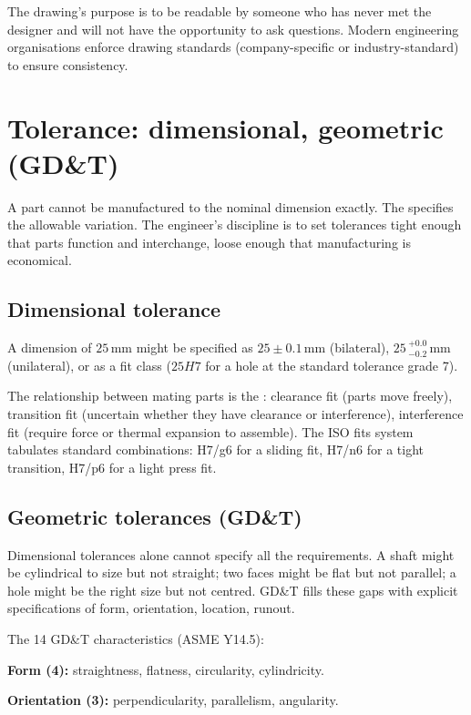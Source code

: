 The drawing's purpose is to be readable by someone who has never met the designer and will not have the opportunity to ask questions. Modern engineering organisations enforce drawing standards (company-specific or industry-standard) to ensure consistency.

\section{Tolerance: dimensional, geometric (GD\&T)}

A part cannot be manufactured to the nominal dimension exactly. The  specifies the allowable variation. The engineer's discipline is to set tolerances tight enough that parts function and interchange, loose enough that manufacturing is economical.

\subsection{Dimensional tolerance}

A dimension of $25\,\si{\milli\meter}$ might be specified as $25 \pm 0.1\,\si{\milli\meter}$ (bilateral), $25\,^{+0.0}_{-0.2}\,\si{\milli\meter}$ (unilateral), or as a fit class ($25H7$ for a hole at the standard tolerance grade 7).

The relationship between mating parts is the : clearance fit (parts move freely), transition fit (uncertain whether they have clearance or interference), interference fit (require force or thermal expansion to assemble). The ISO fits system tabulates standard combinations: H7/g6 for a sliding fit, H7/n6 for a tight transition, H7/p6 for a light press fit.

\subsection{Geometric tolerances (GD\&T)}

Dimensional tolerances alone cannot specify all the requirements. A shaft might be cylindrical to size but not straight; two faces might be flat but not parallel; a hole might be the right size but not centred. GD\&T fills these gaps with explicit specifications of form, orientation, location, runout.

The 14 GD\&T characteristics (ASME Y14.5):

\textbf{Form (4):} straightness, flatness, circularity, cylindricity.

\textbf{Orientation (3):} perpendicularity, parallelism, angularity.

